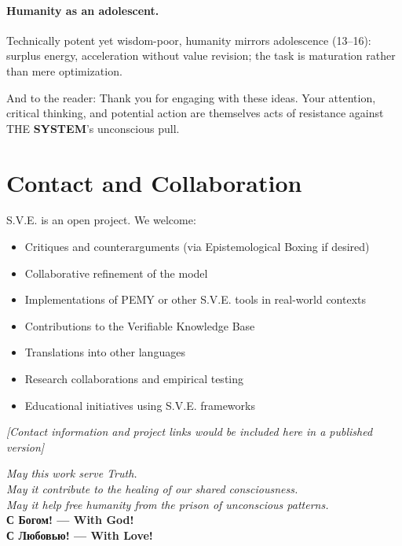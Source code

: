 \documentclass[11pt,a4paper]{article}
\newcommand{\SYSTEM}{\textbf{SYSTEM}}
\theoremstyle{definition}
\theoremstyle{remark}
\begin{document}
\paragraph{Humanity as an adolescent.}
Technically potent yet wisdom-poor, humanity mirrors adolescence (13--16): surplus energy, acceleration without value revision; the task is maturation rather than mere optimization.

\vspace{1em}

And to the reader: Thank you for engaging with these ideas. Your attention, critical thinking, and potential action are themselves acts of resistance against THE \SYSTEM{}'s unconscious pull.

\section*{Contact and Collaboration}

S.V.E. is an open project. We welcome:
\begin{itemize}
\item Critiques and counterarguments (via Epistemological Boxing if desired)
\item Collaborative refinement of the model
\item Implementations of PEMY or other S.V.E. tools in real-world contexts
\item Contributions to the Verifiable Knowledge Base
\item Translations into other languages
\item Research collaborations and empirical testing
\item Educational initiatives using S.V.E. frameworks
\end{itemize}

\textit{[Contact information and project links would be included here in a published version]}

\vspace{2cm}

\begin{center}
\textit{May this work serve Truth.} \\
\textit{May it contribute to the healing of our shared consciousness.} \\
\textit{May it help free humanity from the prison of unconscious patterns.} \\[0.5cm]

\textbf{С Богом! --- With God!} \\
\textbf{С Любовью! --- With Love!}
\end{center}
\end{document}
